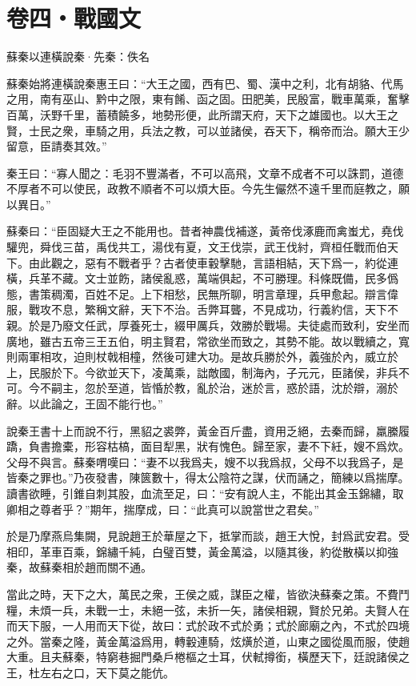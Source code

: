 \documentclass[12pt,a4paper]{ctexbook}
\begin{document}
\section{卷四・戰國文}
蘇秦以連橫說秦·先秦：佚名 \par
蘇秦始將連橫說秦惠王曰：“大王之國，西有巴、蜀、漢中之利，北有胡貉、代馬之用，南有巫山、黔中之限，東有餚、函之固。田肥美，民殷富，戰車萬乘，奮擊百萬，沃野千里，蓄積饒多，地勢形便，此所謂天府，天下之雄國也。以大王之賢，士民之衆，車騎之用，兵法之教，可以並諸侯，吞天下，稱帝而治。願大王少留意，臣請奏其效。”\par
秦王曰：“寡人聞之：毛羽不豐滿者，不可以高飛，文章不成者不可以誅罰，道德不厚者不可以使民，政教不順者不可以煩大臣。今先生儼然不遠千里而庭教之，願以異日。”\par
蘇秦曰：“臣固疑大王之不能用也。昔者神農伐補遂，黃帝伐涿鹿而禽蚩尤，堯伐驩兜，舜伐三苗，禹伐共工，湯伐有夏，文王伐崇，武王伐紂，齊桓任戰而伯天下。由此觀之，惡有不戰者乎？古者使車轂擊馳，言語相結，天下爲一，約從連橫，兵革不藏。文士並飭，諸侯亂惑，萬端俱起，不可勝理。科條既備，民多僞態，書策稠濁，百姓不足。上下相愁，民無所聊，明言章理，兵甲愈起。辯言偉服，戰攻不息，繁稱文辭，天下不治。舌弊耳聾，不見成功，行義約信，天下不親。於是乃廢文任武，厚養死士，綴甲厲兵，效勝於戰場。夫徒處而致利，安坐而廣地，雖古五帝三王五伯，明主賢君，常欲坐而致之，其勢不能。故以戰續之，寬則兩軍相攻，迫則杖戟相橦，然後可建大功。是故兵勝於外，義強於內，威立於上，民服於下。今欲並天下，凌萬乘，詘敵國，制海內，子元元，臣諸侯，非兵不可。今不嗣主，忽於至道，皆惛於教，亂於治，迷於言，惑於語，沈於辯，溺於辭。以此論之，王固不能行也。”\par
說秦王書十上而說不行，黑貂之裘弊，黃金百斤盡，資用乏絕，去秦而歸，羸縢履蹻，負書擔橐，形容枯槁，面目犁黑，狀有愧色。歸至家，妻不下紝，嫂不爲炊。父母不與言。蘇秦喟嘆曰：“妻不以我爲夫，嫂不以我爲叔，父母不以我爲子，是皆秦之罪也。”乃夜發書，陳篋數十，得太公陰符之謀，伏而誦之，簡練以爲揣摩。讀書欲睡，引錐自刺其股，血流至足，曰：“安有說人主，不能出其金玉錦繡，取卿相之尊者乎？”期年，揣摩成，曰：“此真可以說當世之君矣。”\par
於是乃摩燕烏集闕，見說趙王於華屋之下，抵掌而談，趙王大悅，封爲武安君。受相印，革車百乘，錦繡千純，白璧百雙，黃金萬溢，以隨其後，約從散橫以抑強秦，故蘇秦相於趙而關不通。\par
當此之時，天下之大，萬民之衆，王侯之威，謀臣之權，皆欲決蘇秦之策。不費鬥糧，未煩一兵，未戰一士，未絕一弦，未折一矢，諸侯相親，賢於兄弟。夫賢人在而天下服，一人用而天下從，故曰：式於政不式於勇；式於廊廟之內，不式於四境之外。當秦之隆，黃金萬溢爲用，轉轂連騎，炫熿於道，山東之國從風而服，使趙大重。且夫蘇秦，特窮巷掘門桑戶棬樞之士耳，伏軾撙銜，橫歷天下，廷說諸侯之王，杜左右之口，天下莫之能伉。\par
\end{document}
